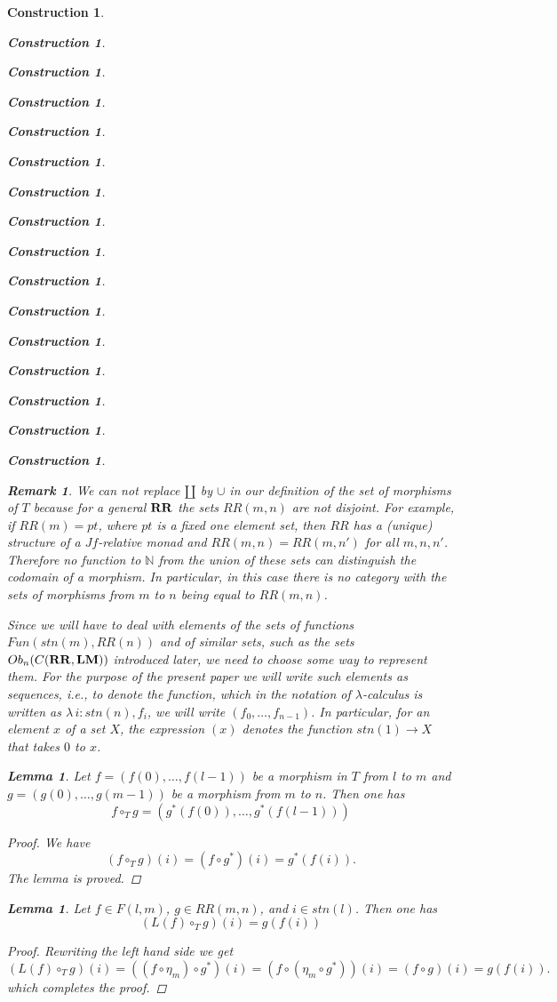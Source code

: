 \documentclass[12pt]{amsart}
\newtheorem{lemma}[proposition]{Lemma}
\newtheorem{remark}[proposition]{Remark}
\numberwithin{proposition}{subsection}
\newtheorem{construction}[proposition]{Construction}
\newcommand{\llabel}[1]{\label{#1}}
\newcommand{\sr}{\rightarrow}
\newcommand{\nn}{{\mathbb N}}
\newcommand{\nat}{\nn}
\newcommand{\mbind}[1]{{#1^*}}
\newcommand{\hc}{\circ_{T}}
\newcommand{\RR}{{\bf RR}}
\newcommand{\LM}{{\bf LM}}
\begin{document}
\begin{construction}
\begin{construction}
\begin{construction}
\begin{construction}
\begin{construction}
\begin{construction}
\begin{construction}
\begin{construction}
\begin{construction}
\begin{construction}
\begin{construction}
\begin{construction}
\begin{construction}
\begin{construction}
\begin{construction}
\begin{construction}
%
\begin{remark}\rm
\llabel{2015.11.20.rem4} 
We can not replace $\amalg$ by $\cup$ in our
definition of the set of morphisms of $T$ because for a general $\RR$ the sets
$RR(m,n)$ are not disjoint.  For example, if $RR(m)=pt$, where $pt$ is a fixed
one element set, then $RR$ has a (unique) structure of a $Jf$-relative monad and
$RR(m,n)=RR(m,n')$ for all $m,n,n'$. Therefore no function to $\nat$ from the
union of these sets can distinguish the codomain of a morphism. In particular,
in this case there is no category with the sets of morphisms from $m$ to $n$
being equal to $RR(m,n)$.
\end{remark}
%
Since we will have to deal with elements of the sets of functions
$Fun(stn(m),RR(n))$ and of similar sets, such as the sets $Ob_n(C(\RR,\LM))$
introduced later, we need to choose some way to represent them. For the purpose
of the present paper we will write such elements as sequences, i.e., to denote
the function, which in the notation of $\lambda$-calculus is written as
$\lambda\,i:stn(n), f_i$, we will write $(f_0,\dots,f_{n-1})$. In particular,
for an element $x$ of a set $X$, the expression $(x)$ denotes the function
$stn(1)\sr X$ that takes $0$ to $x$.
%
\begin{lemma}
\llabel{2016.01.15.l4} 
Let $f=(f(0),\dots,f(l-1))$ be a morphism in $T$ from
$l$ to $m$ and $g=(g(0),\dots,g(m-1))$ be a morphism from $m$ to $n$. Then one has
%
$$f\hc g=(\mbind{g}(f(0)),\dots,\mbind{g}(f(l-1)))$$
%
\end{lemma}
%
\begin{proof}
We have
%
$$(f\hc g)(i)=(f\circ\mbind{g})(i)=\mbind{g}(f(i)).$$
%
The lemma is proved. 
\end{proof}
%
\begin{lemma}
\llabel{2015.08.30.l1}
Let $f\in F(l,m)$, $g\in RR(m,n)$, and $i\in stn(l)$. Then one has
%
\begin{equation}\llabel{2015.08.26.eq4}
(L(f)\hc g)(i)=g(f(i))
\end{equation}%
% 
\end{lemma}
%
\begin{proof}
Rewriting the left hand side we get 
%
$$(L(f)\hc g)(i)=((f\circ \eta_{m})\circ \mbind{g})(i)=(f\circ (\eta_{m}\circ \mbind{g}))(i)=(f\circ g)(i)=g(f(i)).$$
%
which completes the proof. 

\end{proof}
\end{construction}
\end{construction}
\end{construction}
\end{construction}
\end{construction}
\end{construction}
\end{construction}
\end{construction}
\end{construction}
\end{construction}
\end{construction}
\end{construction}
\end{construction}
\end{construction}
\end{construction}
\end{construction}
\end{document}
